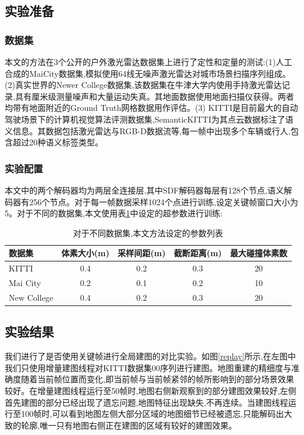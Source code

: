 \subsection{实验准备}
\subsubsection{数据集}
本文的方法在3个公开的户外激光雷达数据集上进行了定性和定量的测试:(1)人工合成的MaiCity数据集\cite{maicity},模拟使用64线无噪声激光雷达对城市场景扫描序列组成。(2)真实世界的Newer College数据集\cite{ncd},该数据集在牛津大学内使用手持激光雷达记录,具有厘米级测量噪声和大量运动失真。其地面数据使用地面扫描仪获得。两者均带有地面附近的Ground Truth网格数据用作评估。(3) KITTI\cite{KITTI}是目前最大的自动驾驶场景下的计算机视觉算法评测数据集,SemanticKITTI\cite{SemanticKITTI}为其点云数据标注了语义信息。其数据包括激光雷达与RGB-D数据流等,每一帧中出现多个车辆或行人,包含超过20种语义标签类型。
\subsubsection{实验配置}
本文中的两个解码器均为两层全连接层,其中SDF解码器每层有128个节点,语义解码器有256个节点。对于每一帧数据采样1024个点进行训练,设定关键帧窗口大小为5。对于不同的数据集,本文使用表\ref{parameters}中设定的超参数进行训练:
\begin{table}[htbp]
    \centering
    \caption{对于不同数据集,本文方法设定的参数列表}\label{parameters}
    \begin{tabular}[htbp]{llcccc}
        \toprule
        \multicolumn{2}{l}{数据集} & 体素大小(m) & 采样间距(m) & 截断距离(m) &最大碰撞体素数 \\
        \midrule
        \multicolumn{2}{l}{KITTI} & 0.4 & 0.2 &0.3 &20\\
        \multicolumn{2}{l}{Mai City} & 0.2 &0.1&0.2&10\\
        \multicolumn{2}{l}{New College} & 0.4 &0.2&0.3&20\\
        \bottomrule
    \end{tabular}
\end{table}
\subsection{实验结果}
我们进行了是否使用关键帧进行全局建图的对比实验。如图\ref{replay}所示,在左图中我们只使用增量建图线程对KITTI数据集00序列进行建图。地图重建的精细度与准确度随着当前帧位置而变化,即当前帧与当前帧紧邻的帧所影响到的部分场景效果较好。在增量建图线程运行至50帧时,地图右侧新观察到的部分建图效果较好,左侧首先建图的部分已经出现了遗忘问题,地图特征出现缺失,不再连续。当建图线程运行至100帧时,可以看到地图左侧大部分区域的地图细节已经被遗忘,只能解码出大致的轮廓,唯一只有地图右侧正在建图的区域有较好的建图效果。

